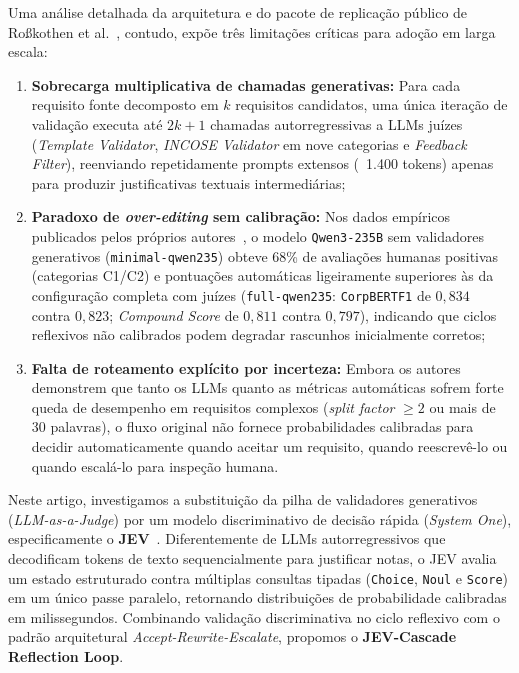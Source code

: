 Uma análise detalhada da arquitetura e do pacote de replicação público de Ro\ss kothen et al.~\cite{rosskothen2026zenodo}, contudo, expõe três limitações críticas para adoção em larga escala:
\begin{enumerate}
    \item \textbf{Sobrecarga multiplicativa de chamadas generativas:} Para cada requisito fonte decomposto em $k$ requisitos candidatos, uma única iteração de validação executa até $2k + 1$ chamadas autorregressivas a LLMs juízes (\textit{Template Validator}, \textit{INCOSE Validator} em nove categorias e \textit{Feedback Filter}), reenviando repetidamente prompts extensos (~1.400 tokens) apenas para produzir justificativas textuais intermediárias;
    \item \textbf{Paradoxo de \textit{over-editing} sem calibração:} Nos dados empíricos publicados pelos próprios autores~\cite{rosskothen2026zenodo}, o modelo \texttt{Qwen3-235B} sem validadores generativos (\texttt{minimal-qwen235}) obteve 68\% de avaliações humanas positivas (categorias C1/C2) e pontuações automáticas ligeiramente superiores às da configuração completa com juízes (\texttt{full-qwen235}: \texttt{CorpBERTF1} de $0{,}834$ contra $0{,}823$; \textit{Compound Score} de $0{,}811$ contra $0{,}797$), indicando que ciclos reflexivos não calibrados podem degradar rascunhos inicialmente corretos;
    \item \textbf{Falta de roteamento explícito por incerteza:} Embora os autores demonstrem que tanto os LLMs quanto as métricas automáticas sofrem forte queda de desempenho em requisitos complexos (\textit{split factor} $\ge 2$ ou mais de 30 palavras), o fluxo original não fornece probabilidades calibradas para decidir automaticamente quando aceitar um requisito, quando reescrevê-lo ou quando escalá-lo para inspeção humana.
\end{enumerate}

Neste artigo, investigamos a substituição da pilha de validadores generativos (\textit{LLM-as-a-Judge}) por um modelo discriminativo de decisão rápida (\textit{System One}), especificamente o \textbf{JEV}~\cite{typesafe2026jev}. Diferentemente de LLMs autorregressivos que decodificam tokens de texto sequencialmente para justificar notas, o JEV avalia um estado estruturado contra múltiplas consultas tipadas (\texttt{Choice}, \texttt{Noul} e \texttt{Score}) em um único passe paralelo, retornando distribuições de probabilidade calibradas em milissegundos. Combinando validação discriminativa no ciclo reflexivo com o padrão arquitetural \textit{Accept-Rewrite-Escalate}, propomos o \textbf{JEV-Cascade Reflection Loop}.

